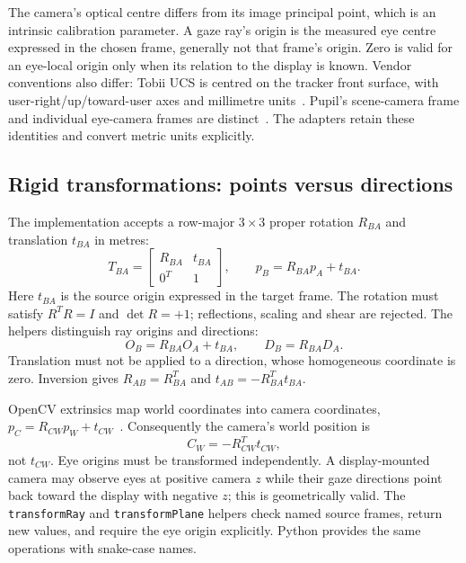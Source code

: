 \documentclass[sigconf,screen,nonacm]{acmart}
\newcommand{\code}[1]{\texttt{#1}}
\begin{document}
The camera's optical centre differs from its image principal point, which is an
intrinsic calibration parameter. A gaze ray's origin is the measured eye centre
expressed in the chosen frame, generally not that frame's origin. Zero is valid
for an eye-local origin only when its relation to the display is known. Vendor
conventions also differ: Tobii UCS is centred on the tracker front surface,
with user-right/up/toward-user axes and millimetre units~\cite{tobii}. Pupil's
scene-camera frame and individual eye-camera frames are distinct~\cite{pupilcoords}.
The adapters retain these identities and convert metric units explicitly.

\subsection{Rigid transformations: points versus directions}
The implementation accepts a row-major $3\times3$ proper rotation $R_{BA}$ and
translation $t_{BA}$ in metres:
\begin{equation}
 T_{BA}=\begin{bmatrix}R_{BA}&t_{BA}\\0^T&1\end{bmatrix},\qquad
 p_B=R_{BA}p_A+t_{BA}.
 \label{eq:rigid}
\end{equation}
Here $t_{BA}$ is the source origin expressed in the target frame. The rotation
must satisfy $R^TR=I$ and $\det R=+1$; reflections, scaling and shear are rejected.
The helpers distinguish ray origins and directions:
\begin{equation}
 O_B=R_{BA}O_A+t_{BA},\qquad D_B=R_{BA}D_A.
 \label{eq:raytransform}
\end{equation}
Translation must not be applied to a direction, whose homogeneous coordinate is
zero. Inversion gives $R_{AB}=R_{BA}^T$ and $t_{AB}=-R_{BA}^Tt_{BA}$.

OpenCV extrinsics map world coordinates into camera coordinates,
$p_C=R_{CW}p_W+t_{CW}$~\cite{opencv}. Consequently the camera's world position is
\begin{equation}
 C_W=-R_{CW}^Tt_{CW},
 \label{eq:cameracentre}
\end{equation}
not $t_{CW}$. Eye origins must be transformed independently. A display-mounted
camera may observe eyes at positive camera $z$ while their gaze directions point
back toward the display with negative $z$; this is geometrically valid. The
\code{transformRay} and \code{transformPlane} helpers check named source frames,
return new values, and require the eye origin explicitly. Python provides the
same operations with snake-case names.
\end{document}
